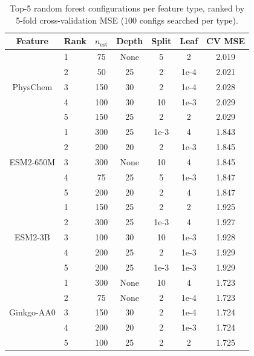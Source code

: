 \documentclass[12pt]{article}
\begin{document}
\begin{table}[H]
\centering
\caption{Top-5 random forest configurations per feature type, ranked by 5-fold cross-validation MSE (100 configs searched per type).}
\label{tab:rf_trials}
\small
\begin{tabular}{clccccc}
\toprule
Feature & Rank & $n_{\text{est}}$ & Depth & Split & Leaf & CV MSE \\
\midrule
\multirow{5}{*}{PhysChem}
 & 1 & 75 & None & 5 & 2 & 2.019 \\
 & 2 & 50 & 25 & 2 & 1e-4 & 2.021 \\
 & 3 & 150 & 30 & 2 & 1e-4 & 2.028 \\
 & 4 & 100 & 30 & 10 & 1e-3 & 2.029 \\
 & 5 & 150 & 25 & 2 & 2 & 2.029 \\
\midrule
\multirow{5}{*}{ESM2-650M}
 & 1 & 300 & 25 & 1e-3 & 4 & 1.843 \\
 & 2 & 200 & 20 & 2 & 1e-3 & 1.845 \\
 & 3 & 300 & None & 10 & 4 & 1.845 \\
 & 4 & 75 & 25 & 5 & 1e-3 & 1.847 \\
 & 5 & 200 & 20 & 2 & 4 & 1.847 \\
\midrule
\multirow{5}{*}{ESM2-3B}
 & 1 & 150 & 25 & 2 & 2 & 1.925 \\
 & 2 & 300 & 25 & 1e-3 & 4 & 1.927 \\
 & 3 & 100 & 30 & 10 & 1e-3 & 1.928 \\
 & 4 & 200 & 25 & 2 & 1e-3 & 1.929 \\
 & 5 & 200 & 25 & 1e-3 & 1e-3 & 1.929 \\
\midrule
\multirow{5}{*}{Ginkgo-AA0}
 & 1 & 300 & None & 10 & 4 & 1.723 \\
 & 2 & 75 & None & 2 & 1e-4 & 1.723 \\
 & 3 & 150 & 30 & 2 & 1e-4 & 1.724 \\
 & 4 & 200 & 20 & 2 & 1e-3 & 1.724 \\
 & 5 & 100 & 25 & 2 & 2 & 1.725 \\
\bottomrule
\end{tabular}
\end{table}
\end{document}

